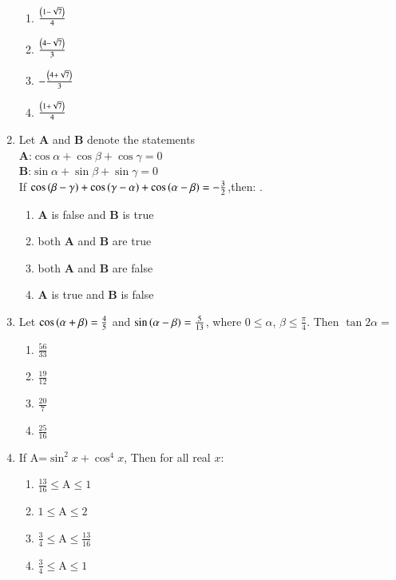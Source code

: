 \documentclass[journal,12pt,twocolumn]{IEEEtran}
\theoremstyle{remark}
\begin{document}
\begin{enumerate}
\begin{multicols}{2}
\begin{enumerate}
\item $\frac{\left(1-\sqrt{7}\right)}{4}$
\item $\frac{\left(4-\sqrt{7}\right)}{3}$
\columnbreak
\item $-\frac{\left(4+\sqrt{7}\right)}{3}$
\item $\frac{\left(1+\sqrt{7}\right)}{4}$
\end{enumerate} 
\end{multicols}
\item Let \textbf{A} and \textbf{B} denote the statements
\\ \textbf{A}:$\cos\alpha+\cos\beta+\cos\gamma=0$
\\ \textbf{B}:$\sin\alpha+\sin\beta+\sin\gamma=0$
\\If $\cos\left(\beta-\gamma\right)+\cos\left(\gamma-\alpha\right)+\cos\left(\alpha-\beta\right)=-\frac{3}{2}$,then:
.\hfill{}
\begin{enumerate}
\item \textbf{A} is false and \textbf{B} is true 
\item both \textbf{A} and \textbf{B} are true
\item both \textbf{A} and \textbf{B} are false 
\item \textbf{A} is true and \textbf{B} is false
\end{enumerate}
\item Let $\cos\left(\alpha+\beta\right)=\frac{4}{5}$  and $\sin\left(\alpha-\beta\right)=\frac{5}{13}$, where $0\le\alpha$, $\beta\le\frac{\pi}{4}$. Then $\tan2\alpha=$ \hfill{}
\begin{multicols}{4}
\begin{enumerate}
\item $\frac{56}{33}$
\columnbreak
\item $\frac{19}{12}$
\columnbreak
\item $\frac{20}{7}$
\columnbreak
\item $\frac{25}{16}$
\end{enumerate} 
\end{multicols}
\item If A=$\sin^2x +\cos^4 x$, Then for all real $x$:
\hfill{}
\begin{multicols}{2} 
\begin{enumerate}
\item $\frac{13}{16}\le$A$\le1$
\item $1\le$A$\le2$
\columnbreak
\item $\frac{3}{4}\le$A$\le\frac{13}{16}$
\item $\frac{3}{4}\le$A$\le1$

\end{enumerate}
\end{multicols}
\end{enumerate}
\end{document}
